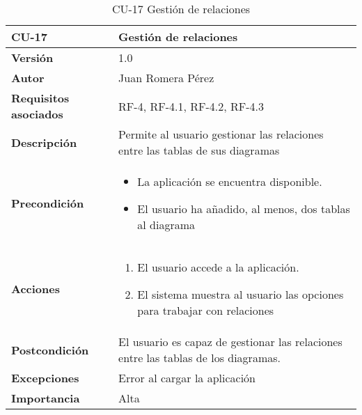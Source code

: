 \begin{table}[p]
    \centering
    \begin{tabularx}{\linewidth}{ p{} p{}}
		\toprule
		\textbf{CU-17}    & \textbf{Gestión de relaciones}\\
		\toprule
		\textbf{Versión}              & 1.0    \\
		\textbf{Autor}                & Juan Romera Pérez \\
		\textbf{Requisitos asociados} & RF-4, RF-4.1, RF-4.2, RF-4.3 \\
		\textbf{Descripción}          & Permite al usuario gestionar las relaciones entre las tablas de sus diagramas \\
		\textbf{Precondición}         & \begin{itemize}
		    \item La aplicación se encuentra disponible.
            \item El usuario ha añadido, al menos, dos tablas al diagrama
		\end{itemize} \\
		\textbf{Acciones}             &
		\begin{enumerate}
			\def\labelenumi{\arabic{enumi}.}
			\tightlist
			\item El usuario accede a la aplicación.
            \item El sistema muestra al usuario las opciones para trabajar con relaciones
		\end{enumerate}\\
		\textbf{Postcondición}        & El usuario es capaz de gestionar las relaciones entre las tablas de los diagramas. \\
		\textbf{Excepciones}          & Error al cargar la aplicación \\
		\textbf{Importancia}          & Alta \\
		\bottomrule
    \end{tabularx}
    \caption{CU-17 Gestión de relaciones}
\end{table}

